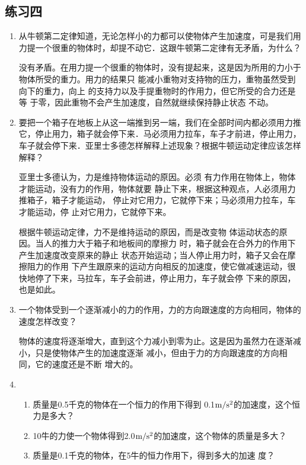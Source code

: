 \subsection{练习四}
\begin{enumerate}
	\item 从牛顿第二定律知道，无论怎样小的力都可以使物体产生加速度，可是我们用力提一个很重的物体时，却提不动它．这跟牛顿第二定律有无矛盾，为什么？
	 
    \begin{solution}
        没有矛盾。在用力提一个很重的物体时，没有提起来，这是因为所用的力小于物体所受的重力。用力的结果只
能减小重物对支持物的压力，重物虽然受到向下的重力，向上
的支持力以及手提重物时的作用力，但它所受的合力还是等
于零，因此重物不会产生加速度，自然就继续保持静止状态
不动。
    \end{solution}
\item 要把一个箱子在地板上从这一端推到另一端，我们在全部时间内都必须用力推它，停止用力，箱子就会停下来．马必须用力拉车，车子才前进，停止用力，车子就会停下来．亚里士多德怎样解释上述现象？根据牛顿运动定律应该怎样解释？
	 
\begin{solution}
    亚里士多德认为，力是维持物体运动的原因。必须
    有力作用在物体上，物体才能运动，没有力的作用，物体就要
    静止下来，根据这种观点，人必须用力推箱子，箱子才能运动，
    停止对它用力，它就停下来；马必须用力拉车，车才能运动，停
    止对它用力，它就停下来。

    根据牛顿运动定律，力不是维持运动的原因，而是改变物
    体运动状态的原因。当人的推力大于箱子和地板间的摩擦力
    时，箱子就会在合外力的作用下产生加速度改变原来的静止
    状态开始运动；当人停止用力时，箱子又会在摩擦阻力的作用
    下产生跟原来的运动方向相反的加速度，使它做减速运动，很
    快地停了下来，马拉车，车子会前进，停止用力，车子就会停
    下来的原因，也是如此。
\end{solution}
\item 一个物体受到一个逐渐减小的力的作用，力的方向跟速度的方向相同，物体的速度怎样改变？
	 
\begin{solution}
    物体的速度将逐渐增大，直到这个力减小到零为止。这是因为虽然力在逐渐减小，只是使物体产生的加速度逐渐
    减小，但由于力的方向跟速度的方向相同，它的速度还是不断
    增大的。
\end{solution}
\item \begin{enumerate}
\item  质量是0.5千克的物体在一个恒力的作用下得到
0.1$\text{m}/\text{s}^2$的加速度，这个恒力是多大？
\item 10牛的力使一个物体得到2.0$\text{m}/\text{s}^2$的加速度，这个物体的质量是多大？
\item 质量是0.1千克的物体，在5牛的恒力作用下，得到多大的加速
度？
\end{enumerate}
	 

\end{enumerate}
